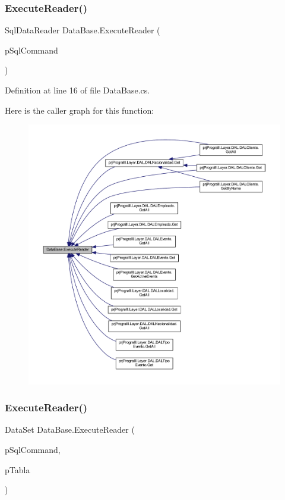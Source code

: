 \subsubsection{\texorpdfstring{Execute\+Reader()}{ExecuteReader()}\hspace{0.1cm}{\footnotesize\ttfamily [1/2]}}
{\footnotesize\ttfamily Sql\+Data\+Reader Data\+Base.\+Execute\+Reader (\begin{DoxyParamCaption}\item[{Sql\+Command}]{p\+Sql\+Command }\end{DoxyParamCaption})}



Definition at line 16 of file Data\+Base.\+cs.

Here is the caller graph for this function\+:
\nopagebreak
\begin{figure}[H]
\begin{center}
\leavevmode
\includegraphics[width=350pt]{class_data_base_a096220b5900862d273830cca2d67e072_icgraph}
\end{center}
\end{figure}
\hypertarget{class_data_base_af22453d62fbefc33844ce05471c0ec07}{}\label{class_data_base_af22453d62fbefc33844ce05471c0ec07} 
\subsubsection{\texorpdfstring{Execute\+Reader()}{ExecuteReader()}\hspace{0.1cm}{\footnotesize\ttfamily [2/2]}}
{\footnotesize\ttfamily Data\+Set Data\+Base.\+Execute\+Reader (\begin{DoxyParamCaption}\item[{Sql\+Command}]{p\+Sql\+Command,  }\item[{String}]{p\+Tabla }\end{DoxyParamCaption})}



